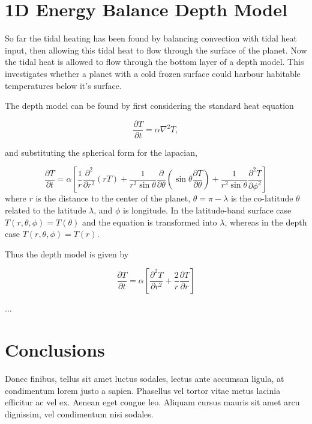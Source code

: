 \documentclass[12pt, onecolumn]{revtex4-2}    %
\begin{document}
\section{1D Energy Balance Depth Model} \label{sec:ebdmodel}

So far the tidal heating has been found by balancing convection with tidal heat input, then allowing this tidal heat to flow through the surface of the planet.
Now the tidal heat is allowed to flow through the bottom layer of a depth model.
This investigates whether a planet with a cold frozen surface could harbour habitable temperatures below it's surface.

The depth model can be found by first considering the standard heat equation

\begin{equation}
    \frac{\partial T}{\partial t} = \alpha \nabla^2 T,
\end{equation}

and substituting the spherical form for the lapacian,

\begin{equation}
    \frac{\partial T}{\partial t}  = \alpha \left[\frac{1}{r} \frac{\partial^2 }{\partial r^2} (r T)
        + \frac{1}{r^2 \sin\theta} \frac{\partial}{\partial \theta}\left(\sin\theta \frac{\partial T}{\partial\theta}\right)
        + \frac{1}{r^2 \sin\theta} \frac{\partial^2 T}{\partial \phi^2} \right]
\end{equation}
where $r$ is the distance to the center of the planet, $\theta = \pi - \lambda$ is the co-latitude $\theta$ related to the latitude $\lambda$, and $\phi$ is longitude.
In the latitude-band surface case $T(r, \theta, \phi) = T(\theta)$ and the equation is transformed into $\lambda$, whereas in the depth case $T(r, \theta, \phi) = T(r)$.

Thus the depth model is given by

\begin{equation}
    \frac{\partial T}{\partial t} = \alpha \left[\frac{\partial^2 T}{\partial r^2} + \frac{2}{r}\frac{\partial T}{\partial r}\right]
\end{equation}

...

\section{Conclusions} \label{sec:conclusion}

Donec finibus, tellus sit amet luctus sodales, lectus ante accumsan ligula, at condimentum lorem justo a sapien. Phasellus vel tortor vitae metus lacinia efficitur ac vel ex. Aenean eget congue leo. Aliquam cursus mauris sit amet arcu dignissim, vel condimentum nisi sodales.
\end{document}
